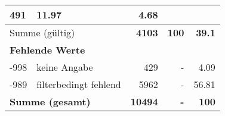 \begin{longtable}{lXrrr}
       \num{491} &
       \num[round-mode=places,round-precision=2]{11,97} &
         \num[round-mode=places,round-precision=2]{4,68} \\
     \midrule
     \multicolumn{2}{l}{Summe (gültig)} &
       \textbf{\num{4103}} &
     \textbf{100} &
       \textbf{\num[round-mode=places,round-precision=2]{39,1}} \\
     \multicolumn{5}{l}{\textbf{Fehlende Werte}}\\
       -998 &
       keine Angabe &
         \num{429} &
        - &
         \num[round-mode=places,round-precision=2]{4,09} \\
       -989 &
       filterbedingt fehlend &
         \num{5962} &
        - &
         \num[round-mode=places,round-precision=2]{56,81} \\
     \midrule
     \multicolumn{2}{l}{\textbf{Summe (gesamt)}} &
          \textbf{\num{10494}} &
        \textbf{-} &
        \textbf{100} \\
     \bottomrule
     \end{longtable}
     
